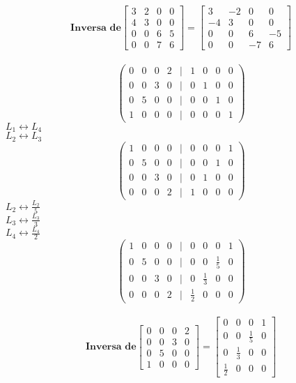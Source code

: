 \documentclass[leqno]{article}
\begin{document}
\begin{enumerate}
\begin{sol}
			  $$\textbf{Inversa de} \begin{bmatrix} 
			  	3 & 2 & 0 & 0 \\
			  	4 & 3 & 0 & 0 \\
			  	0 & 0 & 6 & 5 \\
			  	0 & 0 & 7 & 6
			  \end{bmatrix} = 
		  	\begin{bmatrix} 
		  		3 & -2 & 0 & 0 \\
		  		-4 & 3 & 0 & 0 \\
		  		0 & 0 & 6 & -5 \\
		  		0 & 0 & -7 & 6
		  	\end{bmatrix}$$\\
	  		$$\begin{pmatrix}
	  			0 & 0 & 0 & 2 & | & 1 & 0 & 0 & 0\\
	  			0 & 0 & 3 & 0 & | & 0 & 1 & 0 & 0\\
	  			0 & 5 & 0 & 0 & | & 0 & 0 & 1 & 0\\
	  			1 & 0 & 0 & 0 & | & 0 & 0 & 0 & 1
	  		\end{pmatrix}$$ 
	  		$L_1 \longleftrightarrow L_4$\\
	  		$L_2 \longleftrightarrow L_3$\\
	  		$$\begin{pmatrix}
	  			1 & 0 & 0 & 0 & | & 0 & 0 & 0 & 1\\
	  			0 & 5 & 0 & 0 & | & 0 & 0 & 1 & 0\\
	  			0 & 0 & 3 & 0 & | & 0 & 1 & 0 & 0\\
	  			0 & 0 & 0 & 2 & | & 1 & 0 & 0 & 0
	  		\end{pmatrix}$$
	  		$L_2 \longleftrightarrow \frac{L_2}{5}$\\
	  		$L_3 \longleftrightarrow \frac{L_3}{3}$\\
	  		$L_4 \longleftrightarrow \frac{L_4}{2}$\\
	  		$$\begin{pmatrix}
	  			1 & 0 & 0 & 0 & | & 0 & 0 & 0 & 1\\
	  			0 & 5 & 0 & 0 & | & 0 & 0 & \frac{1}{5} & 0\\
	  			0 & 0 & 3 & 0 & | & 0 & \frac{1}{3} & 0 & 0\\
	  			0 & 0 & 0 & 2 & | & \frac{1}{2} & 0 & 0 & 0
	  		\end{pmatrix}$$\\
	  		$$\textbf{Inversa de} \begin{bmatrix} 
	  			0 & 0 & 0 & 2 \\
	  			0 & 0 & 3 & 0 \\
	  			0 & 5 & 0 & 0 \\
	  			1 & 0 & 0 & 0
	  		 \end{bmatrix} = 
	  		\begin{bmatrix} 
	  			0 & 0 & 0 & 1 \\
	  			0 & 0 & \frac{1}{5} & 0 \\
	  			0 & \frac{1}{3} & 0 & 0 \\
	  			\frac{1}{2} & 0 & 0 & 0
	  		\end{bmatrix}$$
		\end{sol} 
		

\end{enumerate}
\end{document}
